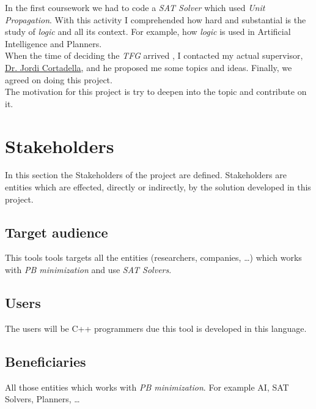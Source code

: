 In the first coursework we had to code a \emph{SAT Solver} which used \emph{Unit Propagation}.
With this activity I comprehended how hard and substantial is the study of \emph{logic} and all its context. For example, how \emph{logic} is used in Artificial Intelligence and Planners.\\

When the time of deciding the \emph{TFG} arrived	, I contacted my actual supervisor, \href{https://www.cs.upc.edu/~jordicf/}{Dr. Jordi Cortadella}, and he proposed me some topics and ideas. Finally, we agreed on doing this project. \\

The motivation for this project is try to deepen into the topic and contribute on it.

\section{Stakeholders}

In this section the Stakeholders of the project are defined. Stakeholders are entities which are effected, directly or indirectly, by the solution developed in this project. 
\subsection{Target audience}
This tools tools targets all the entities (researchers, companies, \ldots) which works with \emph{PB minimization} and use \emph{SAT Solvers}.
\subsection{Users}
The users will be C++ programmers due this tool is developed in this language.
\subsection{Beneficiaries}
All those entities which works with \emph{PB minimization}. For example AI, SAT Solvers, Planners, \ldots


